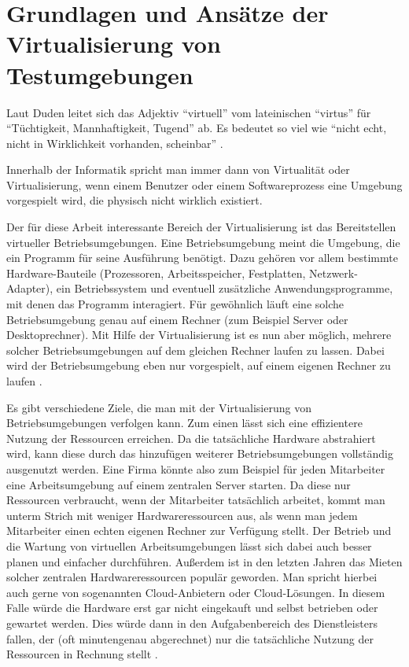 \section{Grundlagen und Ansätze der Virtualisierung von Testumgebungen}

Laut Duden leitet sich das Adjektiv "`virtuell"' vom lateinischen "`virtus"' für "`Tüchtigkeit, Mannhaftigkeit, Tugend"' ab. Es bedeutet so viel wie "`nicht echt, nicht in Wirklichkeit vorhanden, scheinbar"' \citep[Vgl.][]{duden:001}.

Innerhalb der Informatik spricht man immer dann von Virtualität oder Virtualisierung, wenn einem Benutzer oder einem Softwareprozess eine Umgebung vorgespielt wird, die physisch nicht wirklich existiert.

Der für diese Arbeit interessante Bereich der Virtualisierung ist das Bereitstellen virtueller Betriebsumgebungen. Eine Betriebsumgebung meint die Umgebung, die ein Programm für seine Ausführung benötigt. Dazu gehören vor allem bestimmte Hardware-Bauteile (Prozessoren, Arbeitsspeicher, Festplatten, Netzwerk-Adapter), ein Betriebssystem und eventuell zusätzliche Anwendungsprogramme, mit denen das Programm interagiert. Für gewöhnlich läuft eine solche Betriebsumgebung genau auf einem Rechner (zum Beispiel Server oder Desktoprechner). Mit Hilfe der Virtualisierung ist es nun aber möglich, mehrere solcher Betriebsumgebungen auf dem gleichen Rechner laufen zu lassen. Dabei wird der Betriebsumgebung eben nur vorgespielt, auf einem eigenen Rechner zu laufen \citep[Vgl.][Abstract]{DamMohAnd12}.

Es gibt verschiedene Ziele, die man mit der Virtualisierung von Betriebsumgebungen verfolgen kann. Zum einen lässt sich eine effizientere Nutzung der Ressourcen erreichen. Da die tatsächliche Hardware abstrahiert wird, kann diese durch das hinzufügen weiterer Betriebsumgebungen vollständig ausgenutzt werden. Eine Firma könnte also zum Beispiel für jeden Mitarbeiter eine Arbeitsumgebung auf einem zentralen Server starten. Da diese nur Ressourcen verbraucht, wenn der Mitarbeiter tatsächlich arbeitet, kommt man unterm Strich mit weniger Hardwareressourcen aus, als wenn man jedem Mitarbeiter einen echten eigenen Rechner zur Verfügung stellt. Der Betrieb und die Wartung von virtuellen Arbeitsumgebungen lässt sich dabei auch besser planen und einfacher durchführen. Außerdem ist in den letzten Jahren das Mieten solcher zentralen Hardwareressourcen populär geworden. Man spricht hierbei auch gerne von sogenannten Cloud-Anbietern oder Cloud-Lösungen. In diesem Falle würde die Hardware erst gar nicht eingekauft und selbst betrieben oder gewartet werden. Dies würde dann in den Aufgabenbereich des Dienstleisters fallen, der (oft minutengenau abgerechnet) nur die tatsächliche Nutzung der Ressourcen in Rechnung stellt \citep[Vgl.][S. 7]{ZhaChe14}.

